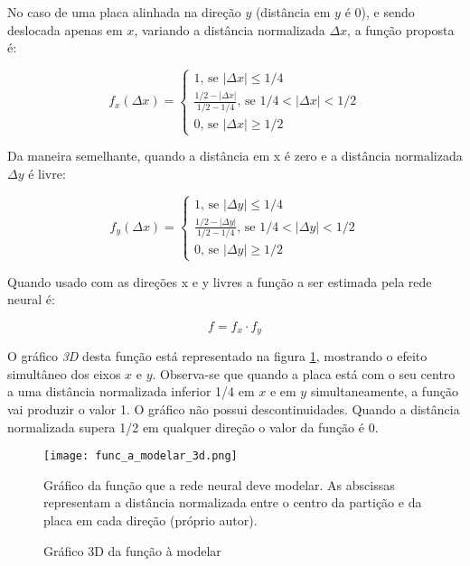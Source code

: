 No caso de uma placa alinhada na direção $y$ (distância em $y$ é 0), e sendo
deslocada apenas em $x$, variando a distância normalizada $\Delta x$, a função
proposta é:

\begin{equation}
	f_x(\Delta x) = \begin{cases}
		1 \text{, se } |\Delta x| \leq 1/4
		\\
		\frac{1/2-|\Delta x|}{1/2-1/4} \text{, se } 1/4<|\Delta x|<1/2
		\\
		0 \text{, se } |\Delta x| \geq 1/2
	\end{cases}
\end{equation}

Da maneira semelhante, quando a distância em x é zero e a distância 
normalizada $\Delta y$ é livre:

\begin{equation}
	f_y(\Delta x) = \begin{cases}
		1 \text{, se } |\Delta y| \leq 1/4
		\\
		\frac{1/2-|\Delta y|}{1/2-1/4} \text{, se } 1/4<|\Delta y|<1/2
		\\
		0 \text{, se } |\Delta y| \geq 1/2
	\end{cases}
\end{equation}

Quando usado com as direções x e y livres a função a ser estimada pela rede
neural é:

\begin{equation} \label{eq:funcao_a_modelar}
	f=f_x \cdot f_y
\end{equation}

O gráfico \emph{3D} desta função está representado na figura
\ref{fig:func_a_modelar_3d}, mostrando o
efeito simultâneo dos eixos $x$ e $y$.  Observa-se que quando a placa
está com o seu centro a uma distância normalizada inferior 1/4 em $x$ e em $y$
simultaneamente, a função vai produzir o valor 1. O gráfico não possui
descontinuidades. Quando a distância normalizada supera 1/2 em qualquer
direção o valor da função é 0.

\begin{figure}[!htb]
	\centering
	\texttt{[image: func\_a\_modelar\_3d.png]}
	\caption{Gráfico 3D da função à modelar}
	\label{fig:func_a_modelar_3d}
	Gráfico da função que a rede neural deve modelar. As abscissas representam
	a distância normalizada entre o centro da partição e da placa em cada
	direção (próprio autor).
\end{figure}


